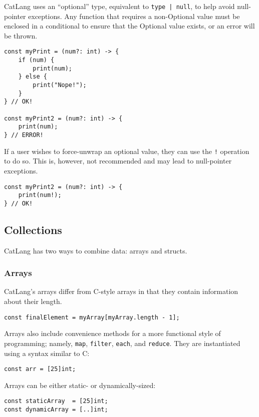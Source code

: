 \documentclass[12pt]{article}
\begin{document}
CatLang uses an ``optional'' type, equivalent to \lstinline!type | null!, to help avoid null-pointer exceptions. Any function that requires a non-Optional value must be enclosed in a conditional to ensure that the Optional value exists, or an error will be thrown.

\begin{lstlisting}
const myPrint = (num?: int) -> {
	if (num) {
		print(num);
	} else {
		print("Nope!");
	}
} // OK!

const myPrint2 = (num?: int) -> {
	print(num);
} // ERROR!
\end{lstlisting}

If a user wishes to force-unwrap an optional value, they can use the \lstinline$!$ operation to do so. This is, however, not recommended and may lead to null-pointer exceptions.

\begin{lstlisting}
const myPrint2 = (num?: int) -> {
	print(num!);
} // OK!
\end{lstlisting}

\subsection{Collections}

CatLang has two ways to combine data: arrays and structs.

\subsubsection{Arrays}

CatLang's arrays differ from C-style arrays in that they contain information about their length.

\begin{lstlisting}
const finalElement = myArray[myArray.length - 1];
\end{lstlisting}

Arrays also include convenience methods for a more functional style of programming; namely, \lstinline!map!, \lstinline!filter!, \lstinline!each!, and \lstinline!reduce!. They are instantiated using a syntax similar to C:

\begin{lstlisting}
const arr = [25]int;
\end{lstlisting}

Arrays can be either static- or dynamically-sized:

\begin{lstlisting}
const staticArray  = [25]int;
const dynamicArray = [..]int;
\end{lstlisting}
\end{document}
